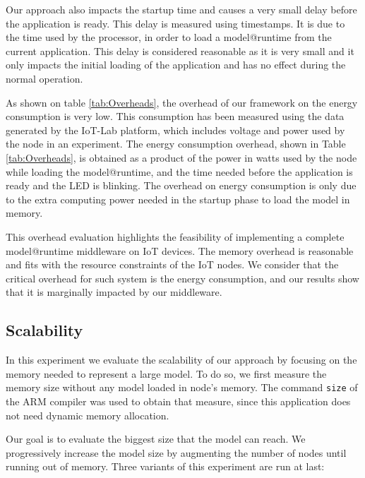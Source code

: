 Our approach also impacts the startup time and causes a very small delay before the application is ready.
This delay is measured using timestamps. It is due to the time used by the processor, in order to load a model@runtime from the current application. This delay is considered reasonable as it is very small and it only impacts the initial loading of the application and has no effect during the normal operation.

As shown on table \ref{tab:Overheads}, the overhead of our framework on the energy consumption is very low.
This consumption has been measured using the data generated by the IoT-Lab platform, which includes voltage and power used by the node in an experiment.
The energy consumption overhead, shown in Table \ref{tab:Overheads}, is obtained as a product of the power in watts used by the node while loading the model@runtime, and the time needed before the application is ready and the LED is blinking.
The overhead on energy consumption is only due to the extra computing power needed in the startup phase to load the model in memory.

This overhead evaluation highlights the feasibility of implementing a complete model@runtime middleware on IoT devices.
The memory overhead is reasonable and fits with the resource constraints of the IoT nodes.
We consider that the critical overhead for such system is the energy consumption, and our results show that it is marginally impacted by our middleware.

\subsection{Scalability}
In this experiment we  evaluate the scalability of our approach by focusing on the memory needed to represent a large model.
To do so, we first measure the memory size without any model loaded in node's memory.
The command \texttt{size} of the ARM compiler was used to obtain that measure, since this application does not need dynamic memory allocation. 


Our goal is to evaluate the biggest size that the model can reach. We progressively increase the model size by augmenting the number of nodes until running out of memory. Three variants of this experiment are run at last:

